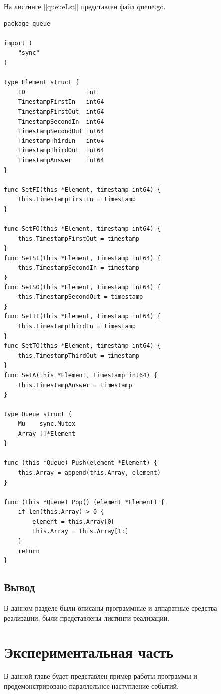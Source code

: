 \documentclass{article}
\begin{document}
		На листинге \hyperref[queueLst]{[\ref{queueLst}]} представлен файл queue.go.
	\begin{lstlisting}[label=queueLst,caption=queue.go]
package queue

import (
	"sync"
)

type Element struct {
	ID                 int
	TimestampFirstIn   int64
	TimestampFirstOut  int64
	TimestampSecondIn  int64
	TimestampSecondOut int64
	TimestampThirdIn   int64
	TimestampThirdOut  int64
	TimestampAnswer    int64
}

func SetFI(this *Element, timestamp int64) {
	this.TimestampFirstIn = timestamp
}

func SetFO(this *Element, timestamp int64) {
	this.TimestampFirstOut = timestamp
}
func SetSI(this *Element, timestamp int64) {
	this.TimestampSecondIn = timestamp
}
func SetSO(this *Element, timestamp int64) {
	this.TimestampSecondOut = timestamp
}
func SetTI(this *Element, timestamp int64) {
	this.TimestampThirdIn = timestamp
}
func SetTO(this *Element, timestamp int64) {
	this.TimestampThirdOut = timestamp
}
func SetA(this *Element, timestamp int64) {
	this.TimestampAnswer = timestamp
}

type Queue struct {
	Mu    sync.Mutex
	Array []*Element
}

func (this *Queue) Push(element *Element) {
	this.Array = append(this.Array, element)
}

func (this *Queue) Pop() (element *Element) {
	if len(this.Array) > 0 {
		element = this.Array[0]
		this.Array = this.Array[1:]
	}
	return
}

	\end{lstlisting}
	\subsection{Вывод}
	В данном разделе были описаны программные и аппаратные средства реализации, были представлены листинги реализации.

	\newpage
	\section{Экспериментальная часть}
	В данной главе будет представлен пример работы программы и продемонстрировано параллельное наступление событий.
\end{document}
